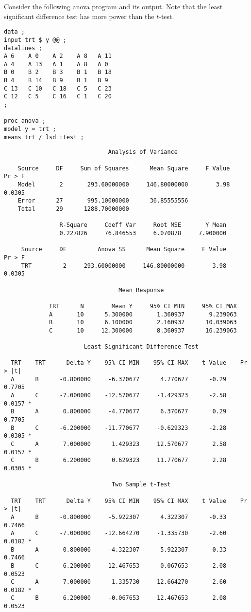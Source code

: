 \documentclass[12pt]{article}
\begin{document}
Consider the following anova program and its output.
Note that the least significant difference test has more power than the $t$-test.

{\scriptsize\begin{verbatim}
data ;
input trt $ y @@ ;
datalines ;
A 6    A 0    A 2    A 8   A 11
A 4    A 13   A 1    A 8   A 0
B 0    B 2    B 3    B 1   B 18
B 4    B 14   B 9    B 1   B 9
C 13   C 10   C 18   C 5   C 23
C 12   C 5    C 16   C 1   C 20
;

proc anova ;
model y = trt ;
means trt / lsd ttest ;
\end{verbatim}}

{\scriptsize\begin{verbatim}
                              Analysis of Variance

    Source     DF     Sum of Squares      Mean Square     F Value     Pr > F
    Model       2       293.60000000     146.80000000        3.98     0.0305
    Error      27       995.10000000      36.85555556                       
    Total      29      1288.70000000                                        

                R-Square     Coeff Var     Root MSE       Y Mean
                0.227826     76.846553     6.070878     7.900000

     Source     DF         Anova SS      Mean Square     F Value     Pr > F
     TRT         2     293.60000000     146.80000000        3.98     0.0305

                                 Mean Response

             TRT      N        Mean Y     95% CI MIN     95% CI MAX
             A       10      5.300000       1.360937       9.239063
             B       10      6.100000       2.160937      10.039063
             C       10     12.300000       8.360937      16.239063

                       Least Significant Difference Test

  TRT    TRT      Delta Y    95% CI MIN    95% CI MAX    t Value    Pr > |t|  
  A      B      -0.800000     -6.370677      4.770677      -0.29      0.7705  
  A      C      -7.000000    -12.570677     -1.429323      -2.58      0.0157 *
  B      A       0.800000     -4.770677      6.370677       0.29      0.7705  
  B      C      -6.200000    -11.770677     -0.629323      -2.28      0.0305 *
  C      A       7.000000      1.429323     12.570677       2.58      0.0157 *
  C      B       6.200000      0.629323     11.770677       2.28      0.0305 *

                               Two Sample t-Test

  TRT    TRT      Delta Y    95% CI MIN    95% CI MAX    t Value    Pr > |t|  
  A      B      -0.800000     -5.922307      4.322307      -0.33      0.7466  
  A      C      -7.000000    -12.664270     -1.335730      -2.60      0.0182 *
  B      A       0.800000     -4.322307      5.922307       0.33      0.7466  
  B      C      -6.200000    -12.467653      0.067653      -2.08      0.0523  
  C      A       7.000000      1.335730     12.664270       2.60      0.0182 *
  C      B       6.200000     -0.067653     12.467653       2.08      0.0523  
\end{verbatim}}
\end{document}
